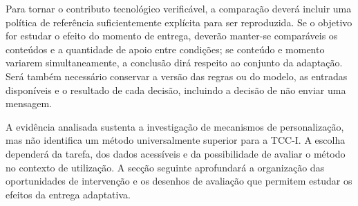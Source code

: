 Para tornar o contributo tecnológico verificável, a comparação deverá incluir uma política de referência suficientemente explícita para ser reproduzida. Se o objetivo for estudar o efeito do momento de entrega, deverão manter-se comparáveis os conteúdos e a quantidade de apoio entre condições; se conteúdo e momento variarem simultaneamente, a conclusão dirá respeito ao conjunto da adaptação. Será também necessário conservar a versão das regras ou do modelo, as entradas disponíveis e o resultado de cada decisão, incluindo a decisão de não enviar uma mensagem.

A evidência analisada sustenta a investigação de mecanismos de personalização, mas não identifica um método universalmente superior para a TCC-I. A escolha dependerá da tarefa, dos dados acessíveis e da possibilidade de avaliar o método no contexto de utilização. A secção seguinte aprofundará a organização das oportunidades de intervenção e os desenhos de avaliação que permitem estudar os efeitos da entrega adaptativa.